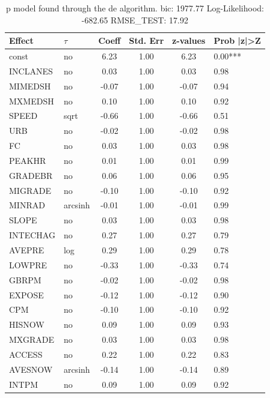 \begin{table}
	\caption{p model found through the de algorithm. bic: 1977.77 Log-Likelihood: -682.65 RMSE_TEST: 17.92}
	\begin{center}
		\begin{tabular}{|l|l|c|c|c|l|}
			\hline
			Effect & $\tau$ & Coeff & Std. Err & z-values & Prob |z|>Z \\
			\hline
			const & no & 6.23 & 1.00 & 6.23 & 0.00*** \\
			\hline
			INCLANES & no & 0.03 & 1.00 & 0.03 & 0.98 \\
			\hline
			MIMEDSH & no & -0.07 & 1.00 & -0.07 & 0.94 \\
			\hline
			MXMEDSH & no & 0.10 & 1.00 & 0.10 & 0.92 \\
			\hline
			SPEED & sqrt & -0.66 & 1.00 & -0.66 & 0.51 \\
			\hline
			URB & no & -0.02 & 1.00 & -0.02 & 0.98 \\
			\hline
			FC & no & 0.03 & 1.00 & 0.03 & 0.98 \\
			\hline
			PEAKHR & no & 0.01 & 1.00 & 0.01 & 0.99 \\
			\hline
			GRADEBR & no & 0.06 & 1.00 & 0.06 & 0.95 \\
			\hline
			MIGRADE & no & -0.10 & 1.00 & -0.10 & 0.92 \\
			\hline
			MINRAD & arcsinh & -0.01 & 1.00 & -0.01 & 0.99 \\
			\hline
			SLOPE & no & 0.03 & 1.00 & 0.03 & 0.98 \\
			\hline
			INTECHAG & no & 0.27 & 1.00 & 0.27 & 0.79 \\
			\hline
			AVEPRE & log & 0.29 & 1.00 & 0.29 & 0.78 \\
			\hline
			LOWPRE & no & -0.33 & 1.00 & -0.33 & 0.74 \\
			\hline
			GBRPM & no & -0.02 & 1.00 & -0.02 & 0.98 \\
			\hline
			EXPOSE & no & -0.12 & 1.00 & -0.12 & 0.90 \\
			\hline
			CPM & no & -0.10 & 1.00 & -0.10 & 0.92 \\
			\hline
			HISNOW & no & 0.09 & 1.00 & 0.09 & 0.93 \\
			\hline
			MXGRADE & no & 0.03 & 1.00 & 0.03 & 0.98 \\
			\hline
			ACCESS & no & 0.22 & 1.00 & 0.22 & 0.83 \\
			\hline
			AVESNOW & arcsinh & -0.14 & 1.00 & -0.14 & 0.89 \\
			\hline
			INTPM & no & 0.09 & 1.00 & 0.09 & 0.92 \\

\end{tabular}
\end{center}
\end{table}
